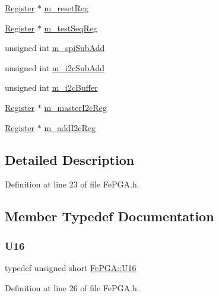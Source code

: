 \begin{DoxyCompactItemize}
\item 
\hyperlink{classRegister}{Register} $\ast$ \hyperlink{classFePGA_aeff1a2370237a06b50e1ae23d933c862}{m\+\_\+reset\+Reg}
\item 
\hyperlink{classRegister}{Register} $\ast$ \hyperlink{classFePGA_a67bc3c8f923b673100974fd86096393e}{m\+\_\+test\+Seq\+Reg}
\item 
unsigned int \hyperlink{classFePGA_a4f2f5d175aeb6dcaf497f81d2f075411}{m\+\_\+spi\+Sub\+Add}
\item 
unsigned int \hyperlink{classFePGA_aba8c2c8d8e0d136826b9dd4c2d7c2e90}{m\+\_\+i2c\+Sub\+Add}
\item 
unsigned int \hyperlink{classFePGA_a173664ffd6a73f454ae31f51e689dd16}{m\+\_\+i2c\+Buffer}
\item 
\hyperlink{classRegister}{Register} $\ast$ \hyperlink{classFePGA_adb390ea8de4a6cbce648dc62e4405f32}{m\+\_\+master\+I2c\+Reg}
\item 
\hyperlink{classRegister}{Register} $\ast$ \hyperlink{classFePGA_af3ef3467ba803e6d3b970ea8982d6246}{m\+\_\+add\+I2c\+Reg}
\end{DoxyCompactItemize}


\subsection{Detailed Description}


Definition at line 23 of file Fe\+P\+G\+A.\+h.



\subsection{Member Typedef Documentation}
\mbox{\label{classFePGA_ac84b20a342a6c963cba061c8bdc37651}} 
\subsubsection{\texorpdfstring{U16}{U16}}
{\footnotesize\ttfamily typedef unsigned short \hyperlink{classFePGA_ac84b20a342a6c963cba061c8bdc37651}{Fe\+P\+G\+A\+::\+U16}}



Definition at line 26 of file Fe\+P\+G\+A.\+h.

\mbox{\label{classFePGA_a1d44a0b27d13179bb1dceb5ec6f4cc1f}} 
